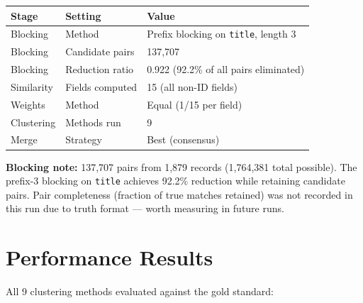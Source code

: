 \documentclass[11pt, a4paper]{article}
\begin{document}
\begin{table}[h!]
\centering
\begin{tabular}{lll}
\toprule
\textbf{Stage} & \textbf{Setting} & \textbf{Value} \\
\midrule
Blocking   & Method          & Prefix blocking on \texttt{title}, length 3 \\
Blocking   & Candidate pairs & 137,707 \\
Blocking   & Reduction ratio & 0.922 (92.2\% of all pairs eliminated) \\
Similarity & Fields computed & 15 (all non-ID fields) \\
Weights    & Method          & Equal (1/15 per field) \\
Clustering & Methods run     & 9 \\
Merge      & Strategy        & Best (consensus) \\
\bottomrule
\end{tabular}
\end{table}

\textbf{Blocking note:} 137,707 pairs from 1,879 records (1,764,381 total possible).
The prefix-3 blocking on \texttt{title} achieves 92.2\% reduction while retaining candidate pairs.
Pair completeness (fraction of true matches retained) was not recorded in this run due to truth
format --- worth measuring in future runs.

\section{Performance Results}

All 9 clustering methods evaluated against the gold standard:
\end{document}
